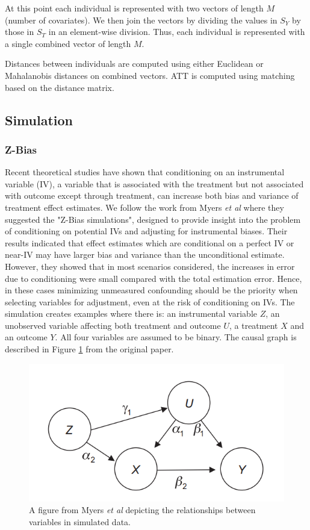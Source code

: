 \documentclass{article}
\begin{document}
At this point each individual is represented with two vectors of length $M$ (number of covariates). We then join the vectors by dividing the values in $S_Y$ by those in $S_T$ in an element-wise division. Thus, each individual is represented with a single combined vector of length $M$.

Distances between individuals are computed using either Euclidean or Mahalanobis distances on combined vectors. ATT is computed using matching based on the distance matrix.

\subsection{Simulation}

\subsubsection{Z-Bias}
Recent theoretical studies have shown that conditioning on an instrumental variable (IV), a variable that is associated with the treatment but not associated with outcome except through treatment, can increase both bias and variance of treatment effect estimates. 
We follow the work from Myers \textit{et al} \cite{myers2011effects} where they suggested the "Z-Bias simulations", designed to provide insight into the problem of conditioning on potential IVs and adjusting for instrumental biases. 
Their results indicated that effect estimates which are conditional on a perfect IV or near-IV may have larger bias and variance than the unconditional estimate. However, they showed that in most scenarios considered, the increases in error due to conditioning were small compared with the total estimation error. Hence, in these cases minimizing unmeasured confounding should be the priority when selecting variables for adjustment, even at the risk of conditioning on IVs.
The simulation creates examples where there is: an instrumental variable $Z$, an unobserved variable affecting both treatment and outcome $U$, a treatment $X$ and an outcome $Y$. All four variables are assumed to be binary. The causal graph is described in Figure \ref{fig:z_bias_explanation} from the original paper.

\begin{figure}
    \centering
    \includegraphics[width=\textwidth]{Paper/images/z_bias_schema_complex.png}
    \caption{A figure from Myers \textit{et al} depicting the relationships between variables in simulated data.}
    \label{fig:z_bias_explanation}
\end{figure} 
\end{document}
